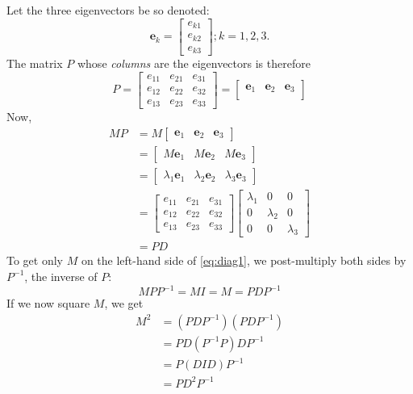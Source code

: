 \documentclass[
  11pt,
  british,
  a4paper,
]{article}
\begin{document}
Let the three eigenvectors be so denoted: \[
\symbf{e}_{k} = \begin{bmatrix}
e_{k1}\\
e_{k2}\\
e_{k3}
\end{bmatrix} ; k = 1, 2, 3.
\] The matrix \(P\) whose \emph{columns} are the eigenvectors is
therefore \[
P = \begin{bmatrix}
e_{11} & e_{21} & e_{31}\\
e_{12} & e_{22} & e_{32}\\
e_{13} & e_{23} & e_{33}
\end{bmatrix}
= \begin{bmatrix}
\symbf{e}_{1} & \symbf{e}_{2} & \symbf{e}_{3}\\
\end{bmatrix}
\] Now, \begin{equation}
\begin{aligned}
MP &= M\begin{bmatrix}
\symbf{e}_{1} & \symbf{e}_{2} & \symbf{e}_{3}
\end{bmatrix}\\
&= \begin{bmatrix}
M\symbf{e}_{1} & M\symbf{e}_{2} & M\symbf{e}_{3}
\end{bmatrix}\\
&= \begin{bmatrix}
\lambda_{1}\symbf{e}_{1} & \lambda_{2}\symbf{e}_{2} & \lambda_{3}\symbf{e}_{3}
\end{bmatrix}\\
&= \begin{bmatrix}
e_{11} & e_{21} & e_{31}\\
e_{12} & e_{22} & e_{32}\\
e_{13} & e_{23} & e_{33}
\end{bmatrix}
\begin{bmatrix}
\lambda_{1} & 0 & 0\\
0 & \lambda_{2} & 0\\
0 & 0 & \lambda_{3}
\end{bmatrix}\\
&= PD
\end{aligned}
\label{eq:diag1}\end{equation} To get only \(M\) on the left-hand side
of \cref{eq:diag1}, we post-multiply both sides by \(P^{-1}\), the
inverse of \(P\): \begin{equation}
MPP^{-1} = MI = M = PDP^{-1}
\label{eq:eigendecomp}\end{equation} If we now square \(M\), we get
\begin{equation}
\begin{aligned}
M^{2} &= (PDP^{-1})(PDP^{-1})\\
&= PD(P^{-1}P)DP^{-1}\\
&= P(DID)P^{-1}\\
&= PD^{2}P^{-1}
\end{aligned}
\label{eq:D-squared}\end{equation}
\end{document}
